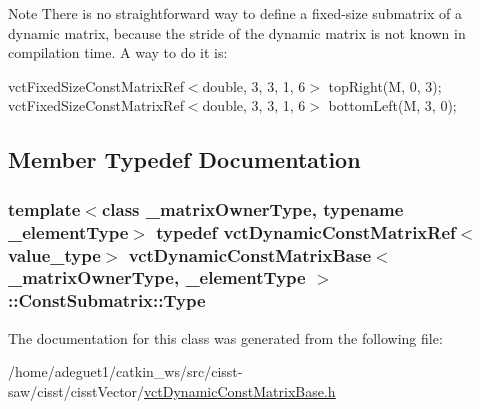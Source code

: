 \begin{DoxyNote}{Note}
There is no straightforward way to define a fixed-\/size submatrix of a dynamic matrix, because the stride of the dynamic matrix is not known in compilation time. A way to do it is\-:
\end{DoxyNote}
vct\-Fixed\-Size\-Const\-Matrix\-Ref$<$double, 3, 3, 1, 6$>$ top\-Right(\-M, 0, 3); vct\-Fixed\-Size\-Const\-Matrix\-Ref$<$double, 3, 3, 1, 6$>$ bottom\-Left(\-M, 3, 0); 

\subsection{Member Typedef Documentation}
\hypertarget{classvct_dynamic_const_matrix_base_1_1_const_submatrix_afbad836196476a7943c76d9a4fc69e28}{
\subsubsection[{Type}]{\setlength{\rightskip}{0pt plus 5cm}template$<$class \-\_\-matrix\-Owner\-Type, typename \-\_\-element\-Type$>$ typedef {\bf vct\-Dynamic\-Const\-Matrix\-Ref}$<$value\-\_\-type$>$ {\bf vct\-Dynamic\-Const\-Matrix\-Base}$<$ \-\_\-matrix\-Owner\-Type, \-\_\-element\-Type $>$\-::{\bf Const\-Submatrix\-::\-Type}}}\label{classvct_dynamic_const_matrix_base_1_1_const_submatrix_afbad836196476a7943c76d9a4fc69e28}


The documentation for this class was generated from the following file\-:\begin{DoxyCompactItemize}
\item 
/home/adeguet1/catkin\-\_\-ws/src/cisst-\/saw/cisst/cisst\-Vector/\hyperlink{vct_dynamic_const_matrix_base_8h}{vct\-Dynamic\-Const\-Matrix\-Base.\-h}\end{DoxyCompactItemize}
